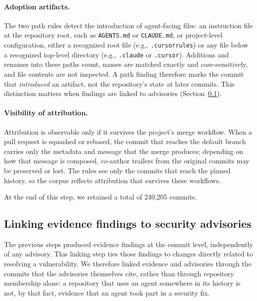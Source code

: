 \documentclass[smallextended,natbib]{svjour3}
\newcommand{\tool}[1]{\texttt{#1}}
\begin{document}
\paragraph{Adoption artifacts.}
The two path rules detect the introduction of agent-facing files: an
instruction file at the repository root, such as \tool{AGENTS.md} or
\tool{CLAUDE.md}, or project-level configuration, either a recognized root file
(e.g., \tool{.cursorrules}) or any file below a recognized top-level directory
(e.g., \tool{.claude} or \tool{.cursor}).  Additions and renames into these
paths count, names are matched exactly and case-sensitively, and file contents
are not inspected.  A path finding therefore marks the commit that
\emph{introduced} an artifact, not the repository's state at later commits.
This distinction matters when findings are linked to advisories
(Section~\ref{sec:linking}).

\paragraph{Visibility of attribution.}
Attribution is observable only if it survives the project's merge workflow.
When a pull request is squashed or rebased, the commit that reaches the default
branch carries only the metadata and message that the merge produces;
depending on how that message is composed, co-author trailers from the original
commits may be preserved or lost.  The rules see only the commits that reach
the pinned history, so the corpus reflects attribution that survives these
workflows.

\endgroup


At the end of this step, we retained a total of 240,205 commits.


\subsection{Linking evidence findings to security advisories}
\label{sec:linking}

The previous steps produced evidence findings at the commit level,
independently of any advisory.  This linking step ties those findings to changes
directly related to resolving a vulnerability.  We therefore linked evidence
and advisories through the commits that the advisories themselves cite, rather
than through repository membership alone: a repository that uses an agent
somewhere in its history is not, by that fact, evidence that an agent took part
in a security fix.
\end{document}
